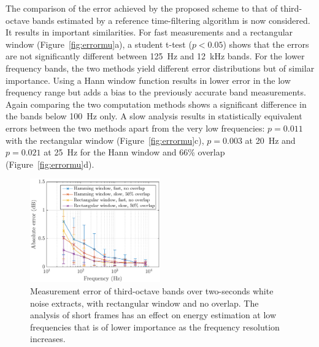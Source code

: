 \documentclass[sensors,article,submit,moreauthors,pdftex,10pt,a4paper]{mdpi}
\begin{document}
The comparison of the error achieved by the proposed scheme to that of third-octave bands estimated by a reference time-filtering algorithm is now considered. It results in important similarities. For fast measurements and a rectangular window (Figure~\ref{fig:errormu}a), a student t-test ($p<0.05$) shows that the errors are not significantly different between 125~Hz and 12~kHz bands. For the lower frequency bands, the two methods yield different error distributions but of similar importance. Using a Hann window function results in lower error in the low frequency range but adds a bias to the previously accurate band measurements. Again comparing the two computation methods shows a significant difference in the bands below 100~Hz only. A slow analysis results in statistically equivalent errors between the two methods apart from the very low frequencies: $p = 0.011$ with the rectangular window (Figure~\ref{fig:errormu}c), $p = 0.003$ at 20~Hz and $p = 0.021$ at 25~Hz for the Hann window and 66\% overlap (Figure~\ref{fig:errormu}d).\\

\begin{figure}[h!]
    \centering
    \includegraphics[width=0.5\textwidth]{figures/err_m_n.eps}
    \caption{Measurement error of third-octave bands over two-seconds white noise extracts, with rectangular window and no overlap. The analysis of short frames has an effect on energy estimation at low frequencies that is of lower importance as the frequency resolution increases.\label{fig:errormn}}
\end{figure}
\end{document}
